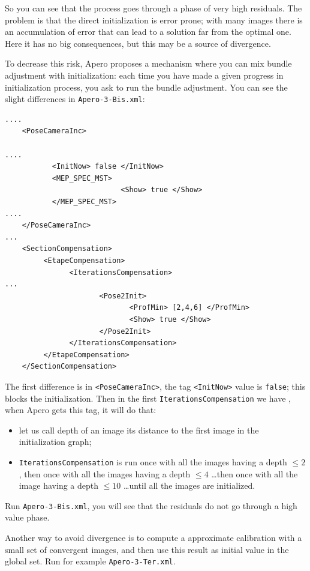 So you can see that the process goes through a phase of very high
residuals.  The problem is that the direct initialization
is error prone; with many images there is an accumulation of error
that can lead to a solution far from the optimal one.
Here it has no big consequences, but this may be a
source of divergence.

To decrease this risk, Apero proposes a mechanism where you can
mix bundle adjustment with initialization: each time you have
made a given progress in initialization process, you ask to run
the bundle adjustment. You can see the slight differences in {\tt  Apero-3-Bis.xml}:

{\scriptsize
\begin{verbatim}
....
    <PoseCameraInc>

....
           <InitNow> false </InitNow>
           <MEP_SPEC_MST>
                           <Show> true </Show>
           </MEP_SPEC_MST>
....
    </PoseCameraInc>
...
    <SectionCompensation>
         <EtapeCompensation>
               <IterationsCompensation>
...
                      <Pose2Init>
                             <ProfMin> [2,4,6] </ProfMin>
                             <Show> true </Show>
                      </Pose2Init>
               </IterationsCompensation>
         </EtapeCompensation>
    </SectionCompensation>
\end{verbatim}
}

The first difference is in {\tt  <PoseCameraInc>}, the tag
{\tt <InitNow>} value is {\tt false}; this blocks the initialization.
Then in the first {\tt IterationsCompensation} we have {\tt <Pose2Init>},
when Apero gets this tag, it will do that:

\begin{itemize}
   \item   let us call  depth  of an image its distance to the first
           image in the initialization graph;

   \item   {\tt IterationsCompensation} is run once with all the images
           having a depth $\leq 2$, then once with all the images
           having a depth $\leq 4$ \dots then once with all the image
           having a depth $\leq 10$  \dots until all the images are
           initialized.
\end{itemize}

Run {\tt  Apero-3-Bis.xml}, you will see that the residuals do not
go through a high value phase.


Another way to avoid divergence is to compute a approximate calibration
with a small set  of convergent images, and then use this result as
initial value in the global set.  Run for example {\tt Apero-3-Ter.xml}.





